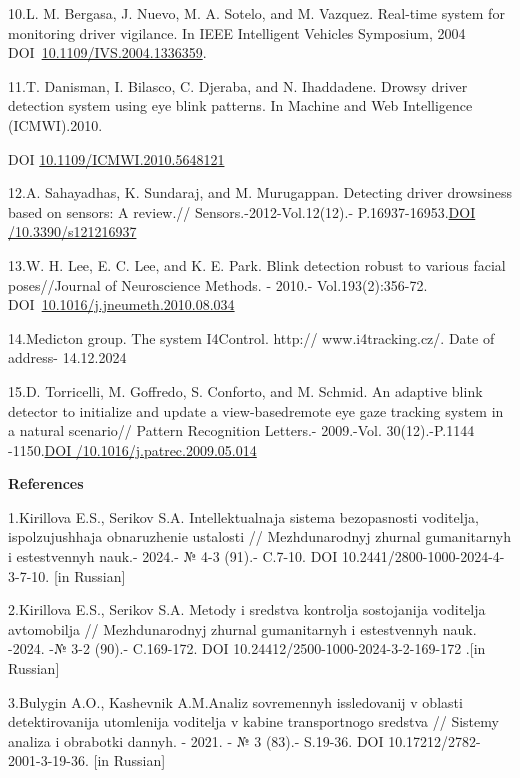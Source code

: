 \documentclass[
]{article}
\begin{document}
10.L. M. Bergasa, J. Nuevo, M. A. Sotelo, and M. Vazquez. Real-time
system for monitoring driver vigilance. In IEEE Intelligent Vehicles
Symposium, 2004
DOI~\href{https://doi.org/10.1109/IVS.2004.1336359}{10.1109/IVS.2004.1336359}.

11.T. Danisman, I. Bilasco, C. Djeraba, and N. Ihaddadene. Drowsy driver
detection system using eye blink patterns. In Machine and Web
Intelligence (ICMWI).2010.

DOI
\href{http://dx.doi.org/10.1109/ICMWI.2010.5648121}{10.1109/ICMWI.2010.5648121}

12.A. Sahayadhas, K. Sundaraj, and M. Murugappan. Detecting driver
drowsiness based on sensors: A review.// Sensors.-2012-Vol.12(12).-
P.16937-16953.\href{https://doi.org/10.3390/s121216937}{DOI
/10.3390/s121216937}

13.W. H. Lee, E. C. Lee, and K. E. Park. Blink detection robust to
various facial poses//Journal of Neuroscience Methods. - 2010.-
Vol.193(2):356-72.
DOI~\href{https://doi.org/10.1016/j.jneumeth.2010.08.034}{10.1016/j.jneumeth.2010.08.034}

14.Medicton group. The system I4Control. http:// www.i4tracking.cz/.
Date of address- 14.12.2024

15.D. Torricelli, M. Goffredo, S. Conforto, and M. Schmid. An adaptive
blink detector to initialize and update a view-basedremote eye gaze
tracking system in a natural scenario// Pattern Recognition Letters.-
2009.-Vol. 30(12).-P.1144
-1150.\href{https://doi.org/10.1016/j.patrec.2009.05.014}{DOI
/10.1016/j.patrec.2009.05.014}

\textbf{References}

1.Kirillova E.S., Serikov S.A. Intellektual\textquotesingle naja sistema
bezopasnosti voditelja, ispol\textquotesingle zujushhaja obnaruzhenie
ustalosti // Mezhdunarodnyj zhurnal gumanitarnyh i estestvennyh nauk.-
2024.- № 4-3 (91).- C.7-10. DOI 10.2441/2800-1000-2024-4-3-7-10. {[}in
Russian{]}

2.Kirillova E.S., Serikov S.A. Metody i sredstva kontrolja sostojanija
voditelja avtomobilja // Mezhdunarodnyj zhurnal gumanitarnyh i
estestvennyh nauk. -2024. -№ 3-2 (90).- C.169-172. DOI
10.24412/2500-1000-2024-3-2-169-172 .{[}in Russian{]}

3.Bulygin A.O., Kashevnik A.M.Analiz sovremennyh issledovanij v oblasti
detektirovanija utomlenija voditelja v kabine transportnogo sredstva //
Sistemy analiza i obrabotki dannyh. - 2021. - № 3 (83).- S.19-36. DOI
10.17212/2782-2001-3-19-36. {[}in Russian{]}
\end{document}
